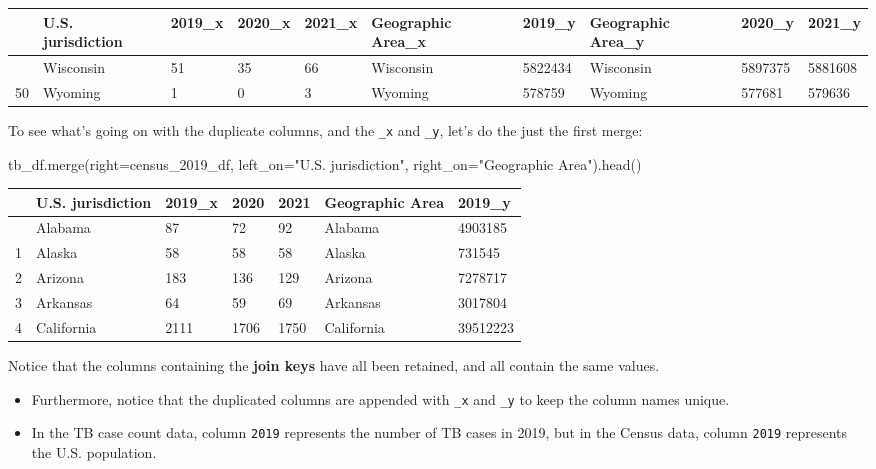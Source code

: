 \documentclass[
  letterpaper,
  DIV=11,
  numbers=noendperiod]{scrreprt}
\newenvironment{Shaded}{\begin{snugshade}}{\end{snugshade}}
\newcommand{\NormalTok}[1]{\textcolor[rgb]{0.00,0.23,0.31}{#1}}
\newcommand{\OperatorTok}[1]{\textcolor[rgb]{0.37,0.37,0.37}{#1}}
\newcommand{\StringTok}[1]{\textcolor[rgb]{0.13,0.47,0.30}{#1}}
\begin{document}
\begin{longtable}[]{@{}llllllllll@{}}
\toprule\noalign{}
& U.S. jurisdiction & 2019\_x & 2020\_x & 2021\_x & Geographic Area\_x &
2019\_y & Geographic Area\_y & 2020\_y & 2021\_y \\
\midrule\noalign{}
\endhead
\bottomrule\noalign{}
\endlastfoot
49 & Wisconsin & 51 & 35 & 66 & Wisconsin & 5822434 & Wisconsin &
5897375 & 5881608 \\
50 & Wyoming & 1 & 0 & 3 & Wyoming & 578759 & Wyoming & 577681 &
579636 \\
\end{longtable}

To see what's going on with the duplicate columns, and the \texttt{\_x}
and \texttt{\_y}, let's do the just the first merge:

\begin{Shaded}
\begin{Highlighting}[]
\NormalTok{tb\_df.merge(right}\OperatorTok{=}\NormalTok{census\_2019\_df, }
\NormalTok{            left\_on}\OperatorTok{=}\StringTok{"U.S. jurisdiction"}\NormalTok{, }
\NormalTok{            right\_on}\OperatorTok{=}\StringTok{"Geographic Area"}\NormalTok{).head()}
\end{Highlighting}
\end{Shaded}

\begin{longtable}[]{@{}lllllll@{}}
\toprule\noalign{}
& U.S. jurisdiction & 2019\_x & 2020 & 2021 & Geographic Area &
2019\_y \\
\midrule\noalign{}
\endhead
\bottomrule\noalign{}
\endlastfoot
0 & Alabama & 87 & 72 & 92 & Alabama & 4903185 \\
1 & Alaska & 58 & 58 & 58 & Alaska & 731545 \\
2 & Arizona & 183 & 136 & 129 & Arizona & 7278717 \\
3 & Arkansas & 64 & 59 & 69 & Arkansas & 3017804 \\
4 & California & 2111 & 1706 & 1750 & California & 39512223 \\
\end{longtable}

Notice that the columns containing the \textbf{join keys} have all been
retained, and all contain the same values.

\begin{itemize}
\item
  Furthermore, notice that the duplicated columns are appended with
  \texttt{\_x} and \texttt{\_y} to keep the column names unique.
\item
  In the TB case count data, column \texttt{2019} represents the number
  of TB cases in 2019, but in the Census data, column \texttt{2019}
  represents the U.S. population.
\end{itemize}
\end{document}
